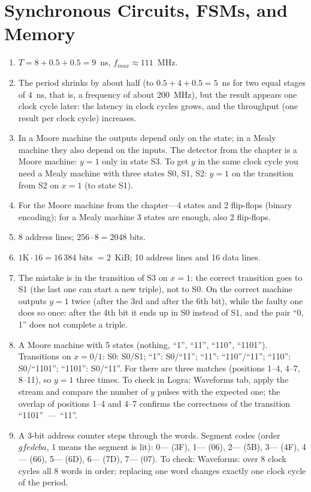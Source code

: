 \section*{Synchronous Circuits, FSMs, and Memory}
\begin{enumerate}
  \item {} $T=8+0.5+0.5=9$~ns, $f_{max}\approx 111$~MHz.
  \item {} The period shrinks by about half (to $0.5+4+0.5=5$~ns for two equal stages of 4~ns, that is, a frequency of about 200~MHz), but the result appears one clock cycle later: the latency in clock cycles grows, and the throughput (one result per clock cycle) increases.
  \item {} In a Moore machine the outputs depend only on the state; in a Mealy machine they also depend on the inputs. The  detector from the chapter is a Moore machine: $y=1$ only in state S3. To get $y$ in the same clock cycle you need a Mealy machine with three states S0, S1, S2: $y=1$ on the transition from S2 on $x=1$ (to state S1).
  \item {} For the Moore machine from the chapter---4 states and 2 flip-flops (binary encoding); for a Mealy machine 3 states are enough, also 2 flip-flops.
  \item {} 8 address lines; $256\cdot 8=2048$ bits.
  \item {} $1\text{K}\cdot 16=16\,384$ bits $=2$~KiB; 10 address lines and 16 data lines.
  \item {} The mistake is in the transition of S3 on $x=1$: the correct transition goes to S1 (the last one can start a new triple), not to S0. On  the correct machine outputs $y=1$ twice (after the 3rd and after the 6th bit), while the faulty one does so once: after the 4th bit it ends up in S0 instead of S1, and the pair ``0, 1'' does not complete a triple.
  \item {} A Moore machine with 5 states (nothing, ``1'', ``11'', ``110'', ``1101''). Transitions on $x=0/1$: S0: S0/S1; ``1'': S0/``11''; ``11'': ``110''/``11''; ``110'': S0/``1101''; ``1101'': S0/``11''. For  there are three matches (positions 1--4, 4--7, 8--11), so $y=1$ three times. To check in Logra: Waveforms tab, apply the stream and compare the number of $y$ pulses with the expected one; the overlap of positions 1--4 and 4--7 confirms the correctness of the transition ``1101''~---~``11''.
  \item {} A 3-bit address counter steps through the words. Segment codes (order $gfedcba$, 1 means the segment is lit): 0--- (3F), 1--- (06), 2--- (5B), 3--- (4F), 4--- (66), 5--- (6D), 6--- (7D), 7--- (07). To check: Waveforms: over 8 clock cycles all 8 words in order; replacing one word changes exactly one clock cycle of the period.
\end{enumerate}

